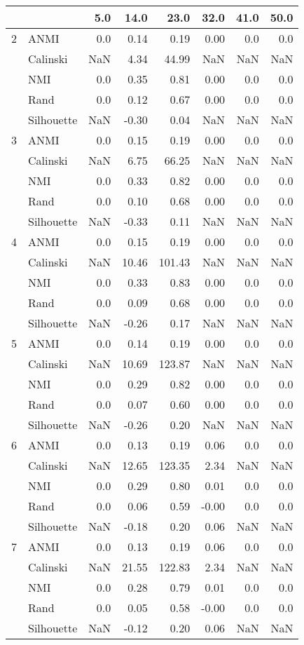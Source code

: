 \begin{tabular}{llrrrrrr}
\toprule
  &     &  5.0  &  14.0 &   23.0 &  32.0 &  41.0 &  50.0 \\
\midrule
2 & ANMI &   0.0 &  0.14 &   0.19 &  0.00 &   0.0 &   0.0 \\
  & Calinski &   NaN &  4.34 &  44.99 &   NaN &   NaN &   NaN \\
  & NMI &   0.0 &  0.35 &   0.81 &  0.00 &   0.0 &   0.0 \\
  & Rand &   0.0 &  0.12 &   0.67 &  0.00 &   0.0 &   0.0 \\
  & Silhouette &   NaN & -0.30 &   0.04 &   NaN &   NaN &   NaN \\
3 & ANMI &   0.0 &  0.15 &   0.19 &  0.00 &   0.0 &   0.0 \\
  & Calinski &   NaN &  6.75 &  66.25 &   NaN &   NaN &   NaN \\
  & NMI &   0.0 &  0.33 &   0.82 &  0.00 &   0.0 &   0.0 \\
  & Rand &   0.0 &  0.10 &   0.68 &  0.00 &   0.0 &   0.0 \\
  & Silhouette &   NaN & -0.33 &   0.11 &   NaN &   NaN &   NaN \\
4 & ANMI &   0.0 &  0.15 &   0.19 &  0.00 &   0.0 &   0.0 \\
  & Calinski &   NaN & 10.46 & 101.43 &   NaN &   NaN &   NaN \\
  & NMI &   0.0 &  0.33 &   0.83 &  0.00 &   0.0 &   0.0 \\
  & Rand &   0.0 &  0.09 &   0.68 &  0.00 &   0.0 &   0.0 \\
  & Silhouette &   NaN & -0.26 &   0.17 &   NaN &   NaN &   NaN \\
5 & ANMI &   0.0 &  0.14 &   0.19 &  0.00 &   0.0 &   0.0 \\
  & Calinski &   NaN & 10.69 & 123.87 &   NaN &   NaN &   NaN \\
  & NMI &   0.0 &  0.29 &   0.82 &  0.00 &   0.0 &   0.0 \\
  & Rand &   0.0 &  0.07 &   0.60 &  0.00 &   0.0 &   0.0 \\
  & Silhouette &   NaN & -0.26 &   0.20 &   NaN &   NaN &   NaN \\
6 & ANMI &   0.0 &  0.13 &   0.19 &  0.06 &   0.0 &   0.0 \\
  & Calinski &   NaN & 12.65 & 123.35 &  2.34 &   NaN &   NaN \\
  & NMI &   0.0 &  0.29 &   0.80 &  0.01 &   0.0 &   0.0 \\
  & Rand &   0.0 &  0.06 &   0.59 & -0.00 &   0.0 &   0.0 \\
  & Silhouette &   NaN & -0.18 &   0.20 &  0.06 &   NaN &   NaN \\
7 & ANMI &   0.0 &  0.13 &   0.19 &  0.06 &   0.0 &   0.0 \\
  & Calinski &   NaN & 21.55 & 122.83 &  2.34 &   NaN &   NaN \\
  & NMI &   0.0 &  0.28 &   0.79 &  0.01 &   0.0 &   0.0 \\
  & Rand &   0.0 &  0.05 &   0.58 & -0.00 &   0.0 &   0.0 \\
  & Silhouette &   NaN & -0.12 &   0.20 &  0.06 &   NaN &   NaN \\
\bottomrule
\end{tabular}
